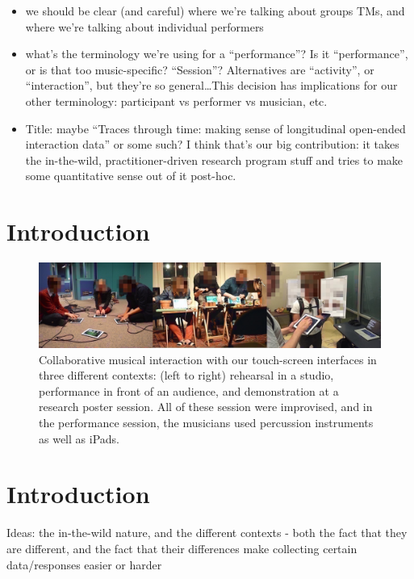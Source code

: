 \documentclass{sigchi}
\begin{document}
\begin{itemize}
\item we should be clear (and careful) where we're talking about
  groups TMs, and where we're talking about individual performers
\item what's the terminology we're using for a ``performance''? Is it
  ``performance'', or is that too music-specific? ``Session''?
  Alternatives are ``activity'', or ``interaction'', but they're so
  general\ldots This decision has implications for our other
  terminology: participant vs performer vs musician, etc.
\item Title: maybe ``Traces through time: making sense of longitudinal
  open-ended interaction data'' or some such? I think that's our big
  contribution: it takes the in-the-wild, practitioner-driven research
  program stuff and tries to make some quantitative sense out of it
  post-hoc.
\end{itemize}

\section{Introduction}

\begin{figure}
  \centering
  \includegraphics[width=\linewidth]{figures/three-performance-contexts}
  \caption{Collaborative musical interaction with our touch-screen
    interfaces in three different contexts: (left to right) rehearsal
    in a studio,
    performance in front of an audience, and demonstration at a
    research poster session. All of these session were improvised,
    and in the performance session, the musicians used percussion
    instruments as well as iPads.
    \label{fig:three-performance-contexts}}
\end{figure}

\section{Introduction}

Ideas: the in-the-wild nature, and the different contexts - both the
fact that they are different, and the fact that their differences make
collecting certain data/responses easier or harder
\end{document}
